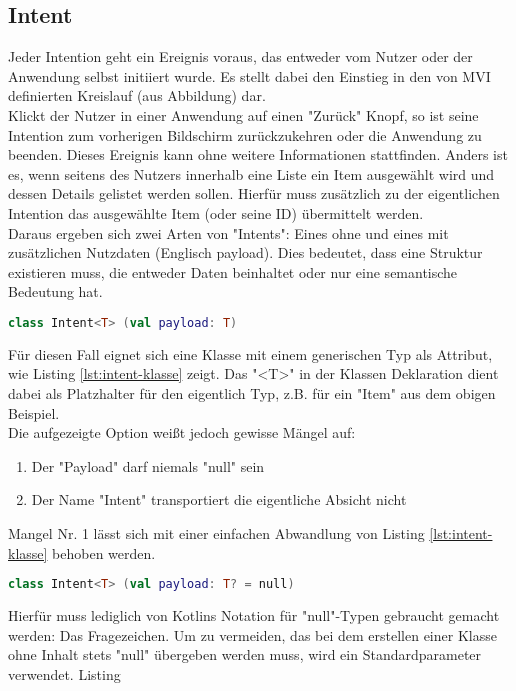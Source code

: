 \subsection{Intent}
Jeder Intention geht ein Ereignis voraus, das entweder vom Nutzer oder der Anwendung selbst initiiert wurde. Es stellt dabei den Einstieg in den von MVI definierten Kreislauf (aus Abbildung) dar. 
\\
Klickt der Nutzer in einer Anwendung auf einen "Zurück" Knopf, so ist seine Intention zum vorherigen Bildschirm zurückzukehren oder die Anwendung zu beenden. Dieses Ereignis kann ohne weitere Informationen stattfinden. Anders ist es, wenn seitens des Nutzers innerhalb eine Liste ein Item ausgewählt wird und dessen Details gelistet werden sollen. Hierfür muss zusätzlich zu der eigentlichen Intention das ausgewählte Item (oder seine ID) übermittelt werden.
\\
Daraus ergeben sich zwei Arten von "Intents": Eines ohne und eines mit zusätzlichen Nutzdaten (Englisch payload). Dies bedeutet, dass eine Struktur existieren muss, die entweder Daten beinhaltet oder nur eine semantische Bedeutung hat.
\begin{lstlisting}[caption={Intent Klasse}, label={lst:intent-klasse}, language=Kotlin]
class Intent<T> (val payload: T)
\end{lstlisting}
\bigskip
Für diesen Fall eignet sich eine Klasse mit einem generischen Typ als Attribut, wie Listing
\ref{lst:intent-klasse}
zeigt. Das "<T>" in der Klassen Deklaration dient dabei als Platzhalter für den eigentlich Typ, z.B. für ein "Item" aus dem obigen Beispiel.
\\
Die aufgezeigte Option weißt jedoch gewisse Mängel auf:
\begin{enumerate}
	\item Der "Payload" darf niemals "null" sein
	\item Der Name "Intent" transportiert die eigentliche Absicht nicht
\end{enumerate}
\bigskip
Mangel Nr. 1 lässt sich mit einer einfachen Abwandlung von Listing
\ref{lst:intent-klasse}
behoben werden. 
\begin{lstlisting}[caption={Intent Klasse}, label={lst:intent-klasse-2}, language=Kotlin]
class Intent<T> (val payload: T? = null)
\end{lstlisting}
\bigskip
Hierfür muss lediglich von Kotlins Notation für "null"-Typen gebraucht gemacht werden: Das Fragezeichen. Um zu vermeiden, das bei dem erstellen einer Klasse ohne Inhalt stets "null" übergeben werden muss, wird ein Standardparameter verwendet. Listing
